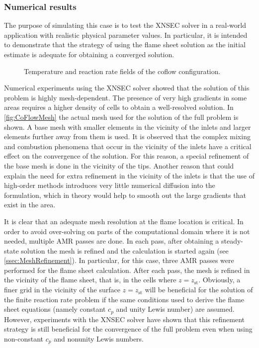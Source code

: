 \subsubsection{Numerical results}
The purpose of simulating this case is to test the XNSEC solver in a real-world application with realistic physical parameter values. In particular, it is intended to demonstrate that the strategy of using the flame sheet solution as the initial estimate is adequate for obtaining a converged solution.%
\begin{figure}[t!]
	\centering
	\pgfplotsset{width=0.6\textwidth, compat=1.3}
	\hspace{-2.4cm} 	
	\caption{Temperature and reaction rate fields of the coflow configuration.} \label{fig:CoFlowFlameFig}
\end{figure}
Numerical experiments using the XNSEC solver showed that the solution of this problem is highly mesh-dependent. The presence of very high gradients in some areas requires a higher density of cells to obtain a well-resolved solution.  In \cref{fig:CoFlowMesh} the actual mesh used for the solution of the full problem is shown.  A base mesh with smaller elements in the vicinity of the inlets and larger elements further away from them is used. It is observed that the complex mixing and combustion phenomena that occur in the vicinity of the inlets have a critical effect on the convergence of the solution. For this reason, a special refinement of the base mesh is done in the vicinity of the tips. Another reason that could explain the need for extra refinement in the vicinity of the inlets is that the use of high-order methods introduces very little numerical diffusion into the formulation, which in theory would help to smooth out the large gradients that exist in the area. 

It is clear that an adequate mesh resolution at the flame location is critical. In order to avoid over-solving on parts of the computational domain where it is not needed, multiple \Gls{AMR} passes are done.  In each pass, after obtaining a steady-state solution the mesh is refined and the calculation is started again (see \cref{ssec:MeshRefinement}). In particular, for this case, three AMR passes were performed for the flame sheet calculation. After each pass, the mesh is refined in the vicinity of the flame sheet, that is, in the cells where $z = z_{\text{st}}$. 
Obviously, a finer grid in the vicinity of the surface $z = z_{\text{st}}$ will be beneficial for the solution of the finite reaction rate problem if the same conditions used to derive the flame sheet equations (namely constant $c_p$ and unity Lewis number) are assumed.  
However, experiments with the XNSEC solver have shown that this refinement strategy is still beneficial for the convergence of the full problem even when using non-constant $c_p$ and nonunity Lewis numbers.

